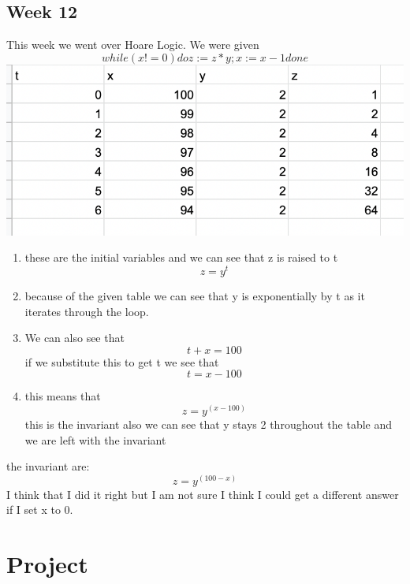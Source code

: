 \documentclass{article}
\theoremstyle{theorem}
\theoremstyle{definition}
\theoremstyle{remark}
\begin{document}
\subsection{Week 12}
This week we went over Hoare Logic. We were given \[ while (x!=0) do z:=z*y;  x:= x-1 done
 \]
 \includegraphics[scale=0.6]{hw12.jpg}
 \begin{enumerate}
  \item  these are the initial variables and we can see that z is raised to t \[ z=y^t\]
   \item because of the given table we can see that y is exponentially by t as it iterates through the loop.
    \item We can also see that \[ t + x =100\] if we substitute this to get t we see that \[ t = x-100\]
    \item this means that \[ z=y^(x-100) \] this is the invariant also we can see that y stays 2 throughout the table and we are left with the invariant

\end{enumerate}
 
  the invariant are: \[ z =  y^(100-x) \]
I think that I did it right but I am not sure I think I could get a different answer if I set x to 0.
\section{Project}\label{Project}
\end{document}

